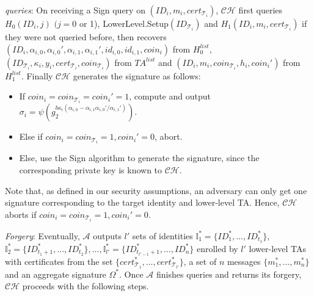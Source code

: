 \documentclass[10pt,journal,compsoc]{IEEEtran}
\begin{document}
\smallskip
{} \emph{queries}: On receiving a {\sf Sign} query
on $(ID_i,m_i,cert_{\mathcal{T}_i})$, $\mathcal {CH}$ first queries
$H_0(ID_i,j)$ $(j=0$ or 1), {\sf
LowerLevel.Setup}$(ID_{\mathcal{T}_i})$ and
$H_1(ID_i,m_i,cert_{\mathcal{T}_i})$ if they were not queried
before, then recovers
$(ID_i,\alpha_{i,0},\alpha_{i,0}',\alpha_{i,1},\alpha_{i,1}',id_{i,0},id_{i,1},coin_i)$
from $H_0^{list}$,
$(ID_{\mathcal{T}_i},\kappa_i,y_i,cert_{\mathcal{T}_i},coin_{\mathcal{T}_i})$
from $TA^{list}$ and $(ID_i,m_i,coin_{\mathcal{T}_i},h_i,coin_i')$
from $H_1^{list}$. Finally $\mathcal {CH}$ generates the signature as
follows:
\begin{itemize}
    \item  If $coin_i=coin_{\mathcal{T}_i}=coin_i'=1$, compute and output
    $\sigma_i=\psi(g_2^{b\kappa_i({\alpha_{i,0}-\alpha_{i,1}\alpha_{i,0}'/\alpha_{i,1}'})}).$

    \item Else if $coin_i=coin_{\mathcal{T}_i}=1,coin_i'=0$, abort.

    \item Else, use the {\sf Sign} algorithm to generate the signature,
    since the corresponding private key is known to $\mathcal {CH}$.
\end{itemize}

 Note that, as defined in our security
assumptions, an adversary can only get one signature corresponding to the target identity and lower-level TA.
 Hence, $\mathcal {CH}$ aborts if
 $coin_i=coin_{\mathcal{T}_i}=1,coin_i'=0$.

\smallskip
\noindent \emph{Forgery}: Eventually, $\mathcal {A}$ outputs $l'$
sets of identities $\mathbb{I}_1^*=\{ID_1^*,...,ID_{t_1}^*\}$,
$\mathbb{I}_2^*=\{ID_{t_1+1}^*,...,ID_{t_2}^*\}
,...,\mathbb{I}_{l'}^*=\{ID_{t_{l'-1}+1}^*,...,ID_n^*\}$ enrolled by
$l'$ lower-level TAs with certificates from the set
$\{cert_{\mathcal{T}_1}^*,...,cert_{\mathcal{T}_{l'}}^*\}$, a set of
$n$ messages $\{m_1^*,...,m_n^*\}$ and an aggregate signature
$\Omega^*$. Once $\mathcal {A}$ finishes queries and returns its
forgery, $\mathcal {CH}$ proceeds with the following steps.
\end{document}
